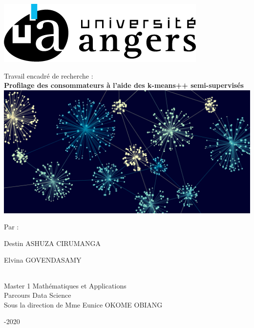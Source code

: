 \documentclass[12pt,a4paper]{book}
\newcommand{\1}{\mathds{1}}
\begin{document}
	
\begin{titlepage}
	\thispagestyle{empty}
	\begin{center}
	
    \includegraphics[scale=1.]{Logo}  
	\vspace{1 cm}

	{\fontsize{25}{30} \selectfont Travail encadré de recherche :}\\
	\vspace{0.7 cm}
	\textbf{{\fontsize{30}{35} \selectfont Profilage des consommateurs à l'aide des k-means++ semi-supervisés}}\\
	\vspace{1 cm}
	\includegraphics[width=11 cm]{image1}  
	
	\vspace{1.5 cm}
	{\fontsize{15}{25} \selectfont Par : \\
		\item Destin ASHUZA CIRUMANGA
		\item Elvina GOVENDASAMY
	}\\
	\vspace{0.5 cm}
	{\fontsize{15}{25} \selectfont Master 1 Mathématiques et Applications}\\
	{\fontsize{15}{25} \selectfont Parcours Data Science}\\
	\vspace{1 cm}
	{\fontsize{15}{25} \selectfont Sous la direction de Mme Eunice OKOME OBIANG}
	\vspace{1.5 cm}

	{\fontsize{20}{30} -2020}\\
	
	\end{center}
\end{titlepage}
\end{document}
